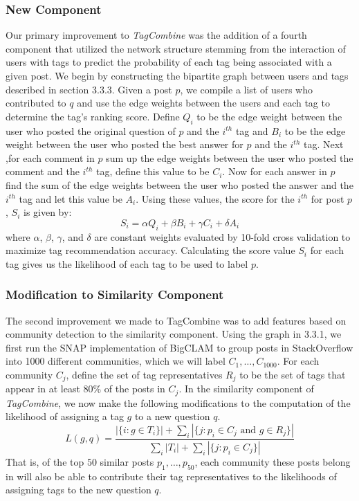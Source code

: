 \documentclass[11pt]{IEEEtran}
\begin{document}
\subsubsection{New Component}

Our primary improvement to \textit{TagCombine} was the addition of a fourth component that utilized the network structure stemming from the interaction of users with tags to predict the probability of each tag being associated with a given post. We begin by constructing the bipartite graph between users and tags described in section 3.3.3. Given a post $p$, we compile a list of users who contributed to $q$ and use the edge weights between the users and each tag to determine the tag’s ranking score. Define $Q_i$ to be the edge weight between the user who posted the original question of $p$ and the $i^{th}$ tag and $B_i$ to be the edge weight between the user who posted the best answer for $p$ and the $i^{th}$ tag. Next ,for each comment in $p$ sum up the edge weights between the user who posted the comment and the $i^{th}$ tag, define this value to be $C_i$. Now for each answer in $p$ find the sum of the edge weights between the user who posted the answer and the $i^{th}$ tag and let this value be $A_i$. Using these values, the score for the $i^{th}$ for post $p$, $S_i$ is given by:
\[ S_i = \alpha Q_i + \beta B_i + \gamma C_i + \delta A_i \]
where $\alpha$, $\beta$, $\gamma$, and $\delta$ are constant weights evaluated by 10-fold cross validation to maximize tag recommendation accuracy. Calculating the score value $S_i$ for each tag gives us the likelihood of each tag to be used to label $p$.

\subsubsection{Modification to Similarity Component}

The second improvement we made to TagCombine was to add features based on community detection to the similarity component. Using the graph in 3.3.1, we first run the SNAP implementation of BigCLAM to group posts in StackOverflow into 1000 different communities, which we will label $C_1 , \ldots, C_{1000}$. For each community $C_j$, define the set of tag representatives $R_j$ to be the set of tags that appear in at least $80\%$ of the posts in $C_j$. In the similarity component of \textit{TagCombine}, we now make the following modifications to the computation of the likelihood of assigning a tag $g$ to a new question $q$.
\[ L(g, q) = \frac{ |\{i : g \in T_i \}| + \sum_i |\{j : p_i \in C_j \text{ and } g \in R_j \}| }{\sum_i  |T_i | + \sum_i |\{j : p_i \in C_j\} |} \]
That is, of the top $50$ similar posts $p_1, \ldots, p_{50}$, each community these posts belong in will also be able to contribute their tag representatives to the likelihoods of assigning tags to the new question $q$.
\end{document}

